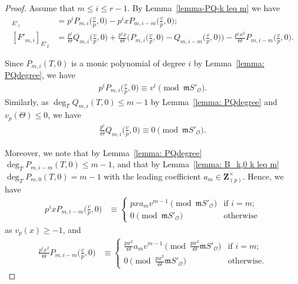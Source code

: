 \documentclass[11pt]{amsart}
\theoremstyle{definition}
\numberwithin{equation}{subsection}
\theoremstyle{plain}
\theoremstyle{plain}
\theoremstyle{plain}
\theoremstyle{plain}
\theoremstyle{plain}
\theoremstyle{plain}
\theoremstyle{plain}
\theoremstyle{plain}
\theoremstyle{plain}
\theoremstyle{plain}
\theoremstyle{plain}
\theoremstyle{plain}
\theoremstyle{definition}
\theoremstyle{definition}
\theoremstyle{definition}
\theoremstyle{remark}
\renewcommand{\(}{\textup{(}}
\renewcommand{\)}{\textup{)}}
\newcommand{\Z}{\mathbf{Z}}
\newcommand{\fm}{\mathfrak{m}}
\newcommand{\cO}{\mathcal{O}}
\begin{document}
\begin{proof}
Assume that $m\leq i\leq r-1$. By Lemma~\ref{lemma-PQ-k leq m} we have
\begin{align*}
[F'_{m,i}]_{E'_1} &=p^i P_{m,i}\Big(\frac{v}{p},0\Big)-p^ix P_{m,i-m}\Big(\frac{v}{p},0\Big); \\
[F'_{m,i}]_{E'_2} &=\frac{p^i}{\Theta}Q_{m,i}\Big(\frac{v}{p},0\Big) +\frac{p^ix}{\Theta}\Big(P_{m,i}\Big(\frac{v}{p},0\Big) -Q_{m,i-m}\Big(\frac{v}{p},0\Big)\Big) -\frac{p^ix^2}{\Theta}P_{m,i-m}\Big(\frac{v}{p},0\Big).
\end{align*}

Since $P_{m,i}(T,0)$ is a monic polynomial of degree $i$ by Lemma~\ref{lemma: PQdegree}, we have
\begin{align*}
    p^iP_{m,i}\Big(\frac{v}{p},0\Big)
    \equiv v^i \pmod{\fm S'_\cO}.
\end{align*}
Similarly, as $\deg_T Q_{m,i}(T,0)\leq m-1$ by Lemma~\ref{lemma: PQdegree} and $v_p(\Theta)\leq 0$, we have
\begin{align*}
    \frac{p^i}{\Theta}Q_{m,i}\Big(\frac{v}{p},0\Big) \equiv 0 \pmod{\fm S'_\cO}.
\end{align*}


Moreover, we note that by Lemma~\ref{lemma: PQdegree} $\deg_T P_{m,i-m}(T,0)\leq m-1$, and that by Lemma~\ref{lemma: B_k,0 k leq m} $\deg_T P_{m,0}(T,0)=m-1$ with the leading coefficient $a_m\in\Z_{(p)}^{\times}$. Hence, we have
\begin{align*}
    p^ix P_{m,i-m}\Big(\frac{v}{p},0\Big)
    &\equiv
    \begin{cases}
        pxa_mv^{m-1}\pmod{\fm S'_\cO} & \mbox{if } i=m; \\
        0\pmod{\fm S'_\cO} & \mbox{otherwise}
    \end{cases}
\end{align*}
as $v_p(x)\geq -1$, and
\begin{align*}
    \frac{p^ix^2}{\Theta}P_{m,i-m}\Big(\frac{v}{p},0\Big)
    &\equiv
    \begin{cases}
        \frac{px^2}{\Theta}a_mv^{m-1}\pmod{\frac{px^2}{\Theta}\fm S'_\cO} & \mbox{if } i=m; \\
        0\pmod{\frac{px^2}{\Theta}\fm S'_\cO} & \mbox{otherwise.}
    \end{cases}
\end{align*}



\end{proof}
\end{document}
